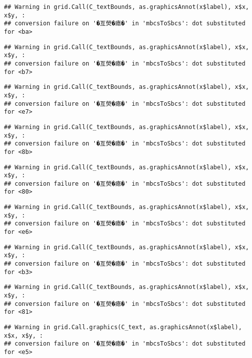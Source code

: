 \documentclass[
]{article}
\begin{document}
\begin{verbatim}
## Warning in grid.Call(C_textBounds, as.graphicsAnnot(x$label), x$x, x$y, :
## conversion failure on '�亙熒�瘜�' in 'mbcsToSbcs': dot substituted for <ba>
\end{verbatim}

\begin{verbatim}
## Warning in grid.Call(C_textBounds, as.graphicsAnnot(x$label), x$x, x$y, :
## conversion failure on '�亙熒�瘜�' in 'mbcsToSbcs': dot substituted for <b7>
\end{verbatim}

\begin{verbatim}
## Warning in grid.Call(C_textBounds, as.graphicsAnnot(x$label), x$x, x$y, :
## conversion failure on '�亙熒�瘜�' in 'mbcsToSbcs': dot substituted for <e7>
\end{verbatim}

\begin{verbatim}
## Warning in grid.Call(C_textBounds, as.graphicsAnnot(x$label), x$x, x$y, :
## conversion failure on '�亙熒�瘜�' in 'mbcsToSbcs': dot substituted for <8b>
\end{verbatim}

\begin{verbatim}
## Warning in grid.Call(C_textBounds, as.graphicsAnnot(x$label), x$x, x$y, :
## conversion failure on '�亙熒�瘜�' in 'mbcsToSbcs': dot substituted for <80>
\end{verbatim}

\begin{verbatim}
## Warning in grid.Call(C_textBounds, as.graphicsAnnot(x$label), x$x, x$y, :
## conversion failure on '�亙熒�瘜�' in 'mbcsToSbcs': dot substituted for <e6>
\end{verbatim}

\begin{verbatim}
## Warning in grid.Call(C_textBounds, as.graphicsAnnot(x$label), x$x, x$y, :
## conversion failure on '�亙熒�瘜�' in 'mbcsToSbcs': dot substituted for <b3>
\end{verbatim}

\begin{verbatim}
## Warning in grid.Call(C_textBounds, as.graphicsAnnot(x$label), x$x, x$y, :
## conversion failure on '�亙熒�瘜�' in 'mbcsToSbcs': dot substituted for <81>
\end{verbatim}

\begin{verbatim}
## Warning in grid.Call.graphics(C_text, as.graphicsAnnot(x$label), x$x, x$y, :
## conversion failure on '�亙熒�瘜�' in 'mbcsToSbcs': dot substituted for <e5>
\end{verbatim}
\end{document}
